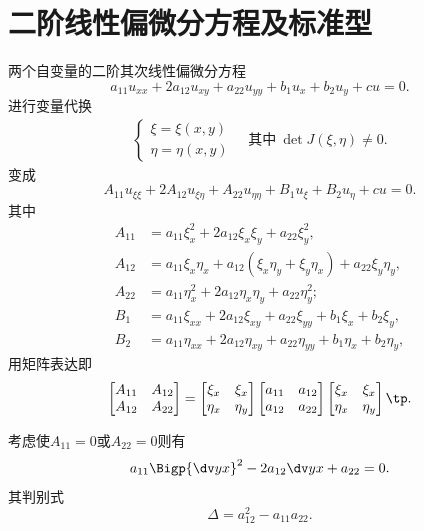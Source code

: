 \section{二阶线性偏微分方程及标准型}
两个自变量的二阶其次线性偏微分方程
\[
	a_{11}u_{xx}+2a_{12}u_{xy}+a_{22}u_{yy}+b_1u_x+b_2u_y+cu=0.
\]
进行变量代换
\begin{align*}
	\begin{cases}
		\xi=\xi(x,y) \\
		\eta=\eta(x,y)
	\end{cases}
	\quad\text{其中}~
	\det J(\xi,\eta)\neq 0.
\end{align*}
变成
\[
	A_{11}u_{\xi\xi}+2A_{12}u_{\xi\eta}+A_{22}u_{\eta\eta}+B_1u_\xi+B_2u_\eta+cu=0.
\]
其中
\begin{align*}
	A_{11} & =a_{11}\xi_x^2+2a_{12}\xi_x\xi_y+a_{22}\xi_y^2,                          \\
	A_{12} & =a_{11}\xi_x\eta_x+a_{12}(\xi_x\eta_y+\xi_y\eta_x)+a_{22}\xi_y\eta_y, \\
	A_{22} & =a_{11}\eta_x^2+2 a_{12}\eta_x\eta_y+a_{22}\eta_y^2;                     \\
	B_1    & =a_{11}\xi_{xx}+2a_{12}\xi_{xy}+a_{22}\xi_{yy}+b_1\xi_x+b_2\xi_y,        \\
	B_2    & =a_{11}\eta_{xx}+2a_{12}\eta_{xy}+a_{22}\eta_{yy}+b_1\eta_x+b_2\eta_y,
\end{align*}
用矩阵表达即
\begin{align*}
	\begin{bmatrix}
		A_{11} & A_{12} \\
		A_{12} & A_{22}
	\end{bmatrix}=\begin{bmatrix}
		\xi_x  & \xi_x  \\
		\eta_x & \eta_y
	\end{bmatrix}\begin{bmatrix}
		a_{11} & a_{12} \\
		a_{12} & a_{22}
	\end{bmatrix}\begin{bmatrix}
		\xi_x  & \xi_x  \\
		\eta_x & \eta_y
	\end{bmatrix}\tp.
\end{align*}

考虑使$A_{11}=0$或$A_{22}=0$则有
\[
	a_{11}\Bigp{\dv yx}^2-2a_{12}\dv yx+a_{22}=0.
\]
其判别式
\[
	\Delta=a_{12}^2-a_{11}a_{22}.
\]
